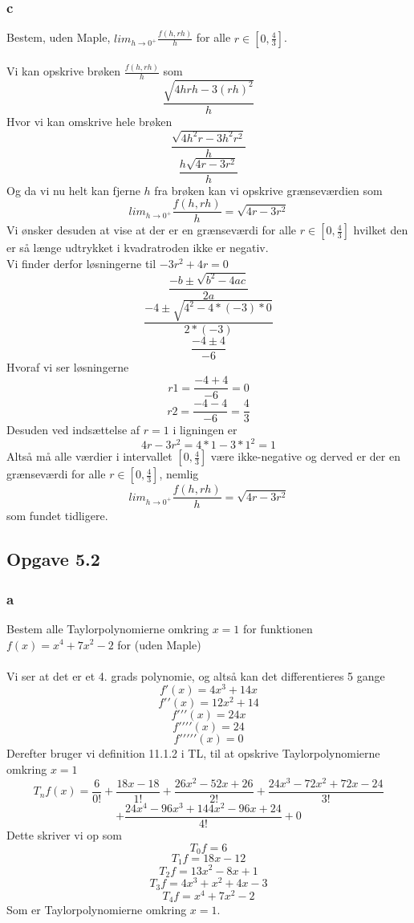 \documentclass[12pt]{article}
\begin{document}
\subsubsection*{c}
Bestem, uden Maple, $lim_{h\rightarrow 0^{+}}\frac{f(h,rh)}{h}$ for alle $r\in [0,\frac{4}{3}]$.\\
\\
Vi kan opskrive brøken $\frac{f(h,rh)}{h}$ som
$$\frac{\sqrt{4hrh-3(rh)^2}}{h}$$
Hvor vi kan omskrive hele brøken
$$\frac{\sqrt{4h^2r-3h^2r^2}}{h}$$
$$\frac{h\sqrt{4r-3r^2}}{h}$$
Og da vi nu helt kan fjerne $h$ fra brøken kan vi opskrive grænseværdien som 
$$lim_{h\rightarrow0^{+}}\frac{f(h,rh)}{h}=\sqrt{4r-3r^2}$$
Vi ønsker desuden at vise at der er en grænseværdi for alle $r\in [0,\frac{4}{3}]$ hvilket den er så længe udtrykket i kvadratroden ikke er negativ.\\
Vi finder derfor løsningerne til $-3r^2+4r=0$
$$\frac{-b\pm \sqrt{b^2-4ac}}{2a}$$
$$\frac{-4\pm \sqrt{4^2-4*(-3)*0}}{2*(-3)}$$
$$\frac{-4\pm 4}{-6}$$
Hvoraf vi ser løsningerne
$$r1=\frac{-4+4}{-6}=0$$
$$r2=\frac{-4-4}{-6}=\frac{4}{3}$$
Desuden ved indsættelse af $r=1$ i ligningen er
$$4r-3r^2=4*1-3*1^2=1$$
Altså må alle værdier i intervallet $[0,\frac{4}{3}]$ være ikke-negative og derved er der en grænseværdi for alle $r\in [0,\frac{4}{3}]$, nemlig
$$lim_{h\rightarrow0^{+}}\frac{f(h,rh)}{h}=\sqrt{4r-3r^2}$$
som fundet tidligere.

\newpage

\subsection*{Opgave 5.2}

\subsubsection*{a}
Bestem alle Taylorpolynomierne omkring $x=1$ for funktionen $f(x)=x^4 +7x^2-2$ for (uden Maple)\\
\\
Vi ser at det er et 4. grads polynomie, og altså kan det differentieres 5 gange
$$f\prime(x)=4x^3+14x$$
$$f\prime\prime(x)=12x^2+14$$
$$f\prime\prime\prime(x)=24x$$
$$f\prime\prime\prime\prime(x)=24$$
$$f\prime\prime\prime\prime\prime(x)=0$$
Derefter bruger vi definition 11.1.2 i TL, til at opskrive Taylorpolynomierne omkring $x=1$
$$T_nf(x)=\frac{6}{0!}+\frac{18x-18}{1!}+\frac{26x^2-52x+26}{2!}+\frac{24x^3-72x^2+72x-24}{3!}$$
$$+\frac{24x^4-96x^3+144x^2-96x+24}{4!}+0$$
Dette skriver vi op som
$$T_0f=6$$
$$T_1f=18x-12$$
$$T_2f=13x^2-8x+1$$
$$T_3f=4x^3+x^2+4x-3$$
$$T_4f=x^4+7x^2-2$$
Som er Taylorpolynomierne omkring $x=1$.
\end{document}

